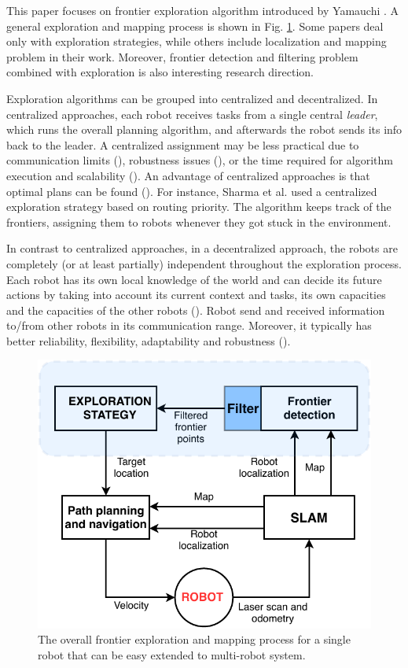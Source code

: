 This paper focuses on frontier exploration algorithm introduced by Yamauchi \cite{Yamauchi1997}. A general exploration and mapping process is shown in Fig. \ref{fig:strategy_one_robot}. Some papers deal only with exploration strategies, while others include localization and mapping problem in their work. Moreover, frontier detection and filtering problem combined with exploration is also interesting research direction.

Exploration algorithms can be grouped into centralized and decentralized. In centralized approaches, each robot receives tasks from a single central \emph{leader}, which runs the overall planning algorithm, and afterwards the robot sends its info back to the leader. A centralized assignment may be less practical due to communication limits (\cite{Dias2000}), robustness issues (\cite{Dias2006}), or the time required for algorithm execution and scalability (\cite{Julia2012}). An advantage of centralized approaches is that optimal plans can be found (\cite{Yan2011}). For instance, Sharma et al. \cite{SharmaHonc2016} used a centralized exploration strategy based on routing priority. The algorithm keeps track of the frontiers, assigning them to robots whenever they got stuck in the environment.

In contrast to centralized approaches, in a decentralized approach, the robots are completely (or at least partially) independent throughout the exploration process. Each robot has its own local knowledge of the world and can decide its future actions by taking into account its current context and tasks, its own capacities and the capacities of the other robots (\cite{Yan2013}). Robot send and received information to/from other robots in its communication range. Moreover, it typically has better reliability, flexibility, adaptability and robustness (\cite{Zlot2002}). 

\begin{figure}[t!]
	\centering
	\includegraphics[width=1.0\columnwidth]{./pictures/strategy_one_robot.pdf}
	\caption {The overall frontier exploration and mapping process for a single robot that can be easy extended to multi-robot system.}
	\label{fig:strategy_one_robot}
\end{figure}
 

